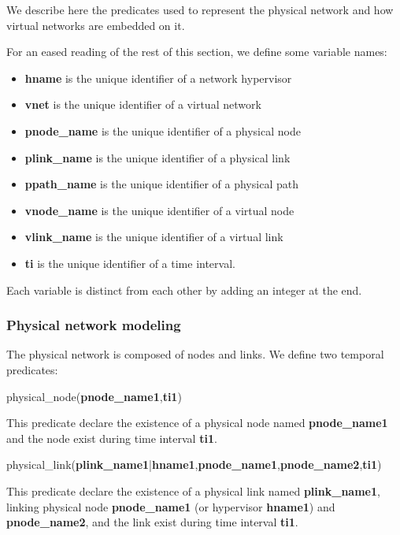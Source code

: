 We describe here the predicates used to represent the physical network and how virtual networks are embedded on it.

For an eased reading of the rest of this section, we define some variable names:

\begin{itemize}
    \item \textbf{hname} is the unique identifier of a network hypervisor
    \item \textbf{vnet} is the unique identifier of a virtual network
    \item \textbf{pnode\_name} is the unique identifier of a physical node
    \item \textbf{plink\_name} is the unique identifier of a physical link
    \item \textbf{ppath\_name} is the unique identifier of a physical path
    \item \textbf{vnode\_name} is the unique identifier of a virtual node
    \item \textbf{vlink\_name} is the unique identifier of a virtual link
    \item \textbf{ti} is the unique identifier of a time interval.
\end{itemize}

Each variable is distinct from each other by adding an integer at the end.

\subsubsection{Physical network modeling}


The physical network is composed of nodes and links. We define two temporal predicates:

physical\_node(\textbf{pnode\_name1},\textbf{ti1})

This predicate declare the existence of a physical node named \textbf{pnode\_name1} and the node exist during time interval \textbf{ti1}.

physical\_link(\textbf{plink\_name1}|\textbf{hname1},\textbf{pnode\_name1},\textbf{pnode\_name2},\textbf{ti1})

This predicate declare the existence of a physical link named \textbf{plink\_name1}, linking physical node \textbf{pnode\_name1} (or hypervisor \textbf{hname1}) and \textbf{pnode\_name2}, and the link exist during time interval \textbf{ti1}.


